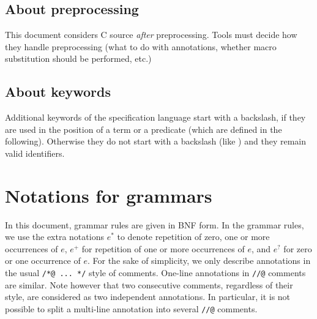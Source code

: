 

\subsection{About preprocessing}

This document considers C source \emph{after} preprocessing.
Tools must decide how they handle preprocessing (what to do with
annotations, whether macro substitution should be performed, etc.)

\subsection{About keywords}

Additional keywords of the specification language start with a
backslash, if they are used in the position of a term or a predicate
(which are defined in the following).  Otherwise they do not start
with a backslash (like \ensures{}) and they remain valid identifiers.

\section{Notations for grammars}

In this document, grammar rules are given in BNF form. In the grammar
rules, we use the extra notations $e^*$ to denote repetition of zero, one
or more occurrences of $e$, $e^+$ for repetition of one or more
occurrences of $e$, and $e^?$ for zero or one occurrence of $e$.  For
the sake of simplicity, we only describe annotations in the usual
\lstinline|/*@ ... */| style of comments. One-line annotations
in \lstinline|//@| comments are similar. Note however that two consecutive
comments, regardless of their style, are considered as two independent
annotations. In particular, it is not possible to split a multi-line
annotation into several \lstinline|//@| comments.

